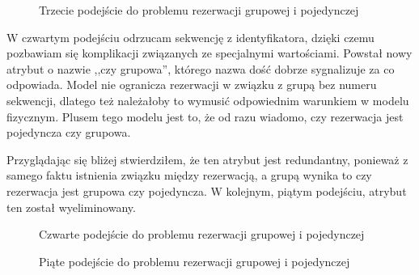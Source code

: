 \documentclass[a4paper,onecolumn,oneside,11pt,wide,floatssmall]{mwrep}
\theoremstyle{definition}
\theoremstyle{plain}%
\theoremstyle{remark}
\begin{document}
\begin{figure}[H]
  \begin{center}
  \end{center}
  \caption{Trzecie podejście do problemu rezerwacji grupowej i pojedynczej}
  \label{fig:db-logical-model-group-reservation-third-try}
\end{figure}

W czwartym podejściu odrzucam sekwencję z identyfikatora, dzięki czemu pozbawiam się komplikacji związanych ze specjalnymi wartościami. Powstał nowy atrybut o nazwie ,,czy grupowa'', którego nazwa dość dobrze sygnalizuje za co odpowiada. Model nie ogranicza rezerwacji w związku z grupą bez numeru sekwencji, dlatego też należałoby to wymusić odpowiednim warunkiem w modelu fizycznym. Plusem tego modelu jest to, że od razu wiadomo, czy rezerwacja jest pojedyncza czy grupowa. 

Przyglądając się bliżej stwierdziłem, że ten atrybut jest redundantny, ponieważ z samego faktu istnienia związku między rezerwacją, a grupą wynika to czy rezerwacja jest grupowa czy pojedyncza. W kolejnym, piątym podejściu, atrybut ten został wyeliminowany.

\begin{figure}[H]
  \begin{center}
  \end{center}
  \caption{Czwarte podejście do problemu rezerwacji grupowej i pojedynczej}
  \label{fig:db-logical-model-group-reservation-fourth-try}
\end{figure}

\begin{figure}[H]
  \begin{center}
  \end{center}
  \caption{Piąte podejście do problemu rezerwacji grupowej i pojedynczej}
  \label{fig:db-logical-model-group-reservation-fifth-try}
\end{figure}
\end{document}
